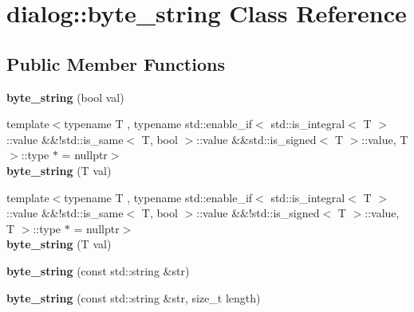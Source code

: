 \hypertarget{classdialog_1_1byte__string}{}\section{dialog\+:\+:byte\+\_\+string Class Reference}
\label{classdialog_1_1byte__string}
\subsection*{Public Member Functions}
\begin{DoxyCompactItemize}
\item 
\mbox{\label{classdialog_1_1byte__string_a0cbac8232055b2fc1808e7ee17db3fcb}} 
{\bfseries byte\+\_\+string} (bool val)
\item 
\mbox{\label{classdialog_1_1byte__string_adee5703c8d59e48f08dba1ca465496e5}} 
{\footnotesize template$<$typename T , typename std\+::enable\+\_\+if$<$ std\+::is\+\_\+integral$<$ T $>$\+::value \&\&!std\+::is\+\_\+same$<$ T, bool $>$\+::value \&\&std\+::is\+\_\+signed$<$ T $>$\+::value, T $>$\+::type $\ast$  = nullptr$>$ }\\{\bfseries byte\+\_\+string} (T val)
\item 
\mbox{\label{classdialog_1_1byte__string_adee5703c8d59e48f08dba1ca465496e5}} 
{\footnotesize template$<$typename T , typename std\+::enable\+\_\+if$<$ std\+::is\+\_\+integral$<$ T $>$\+::value \&\&!std\+::is\+\_\+same$<$ T, bool $>$\+::value \&\&!std\+::is\+\_\+signed$<$ T $>$\+::value, T $>$\+::type $\ast$  = nullptr$>$ }\\{\bfseries byte\+\_\+string} (T val)
\item 
\mbox{\label{classdialog_1_1byte__string_a4659c01ae6b127414e6a08515e1703ed}} 
{\bfseries byte\+\_\+string} (const std\+::string \&str)
\item 
\mbox{\label{classdialog_1_1byte__string_abff23d7b1170ea8804c5a444a9fe3d7c}} 
{\bfseries byte\+\_\+string} (const std\+::string \&str, size\+\_\+t length)
\item 
\mbox{\label{classdialog_1_1byte__string_ac3676d996837aca8e6c091e6d61ee0a4}} 

\end{DoxyCompactItemize}
